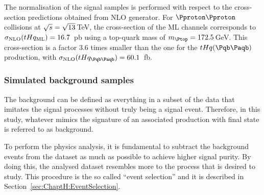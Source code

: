 The normalisation of the \tHq signal samples is performed with respect to the
cross-section predictions obtained from NLO generator. 
For $\Pproton \Pproton$ collisions at
$\sqrt{s} = \sqrt{13}\,$TeV, the cross-section of the ML channels 
corresponds to \mbox{$\sigma_{\text{NLO}} (tHq_{\text{ML}})= 16.7$~pb}
using a top-quark mass of $\mtop =172.5\,$GeV. %
This cross-section is a factor 3.6 times smaller than the one for the $\tHq(\bbbar)$ production, 
with \mbox{$\sigma_{\text{NLO}} (\tHq_{\bbbar})= 60.1$~fb}. 


\subsubsection{Simulated background samples}
\label{sec:ChaptH:Data_and_MC:MC:Bkg}
The background can be defined as everything in a subset of the data that 
imitates the signal processes without truly being a signal event.  Therefore, 
in this study, whatever mimics the signature of an associated \tHq production 
with  \dileptau final state is referred to as background. 

To perform the physics analysis, it is fundamental to subtract the background events from the dataset
as much as possible to achieve higher signal purity.
By doing this, the analysed dataset resembles more to the process that is desired to study.
This procedure is the so called ``event selection'' and it is described in Section~\ref{sec:ChaptH:EventSelection}.

